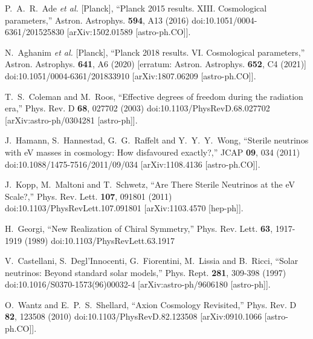 \documentclass[universe,article,submit,moreauthors,pdftex,a4paper]{Definitions/mdpi}
\begin{document}
\begin{thebibliography}{99}
P.~A.~R.~Ade \textit{et al.} [Planck],
``Planck 2015 results. XIII. Cosmological parameters,''
Astron. Astrophys. \textbf{594}, A13 (2016)
doi:10.1051/0004-6361/201525830
[arXiv:1502.01589 [astro-ph.CO]].

N.~Aghanim \textit{et al.} [Planck],
``Planck 2018 results. VI. Cosmological parameters,''
Astron. Astrophys. \textbf{641}, A6 (2020)
[erratum: Astron. Astrophys. \textbf{652}, C4 (2021)]
doi:10.1051/0004-6361/201833910
[arXiv:1807.06209 [astro-ph.CO]].

T.~S.~Coleman and M.~Roos,
``Effective degrees of freedom during the radiation era,''
Phys. Rev. D \textbf{68}, 027702 (2003)
doi:10.1103/PhysRevD.68.027702
[arXiv:astro-ph/0304281 [astro-ph]].

J.~Hamann, S.~Hannestad, G.~G.~Raffelt and Y.~Y.~Y.~Wong,
``Sterile neutrinos with eV masses in cosmology: How disfavoured exactly?,''
JCAP \textbf{09}, 034 (2011)
doi:10.1088/1475-7516/2011/09/034
[arXiv:1108.4136 [astro-ph.CO]].

J.~Kopp, M.~Maltoni and T.~Schwetz,
``Are There Sterile Neutrinos at the eV Scale?,''
Phys. Rev. Lett. \textbf{107}, 091801 (2011)
doi:10.1103/PhysRevLett.107.091801
[arXiv:1103.4570 [hep-ph]].

H.~Georgi,
``New Realization of Chiral Symmetry,''
Phys. Rev. Lett. \textbf{63}, 1917-1919 (1989)
doi:10.1103/PhysRevLett.63.1917

V.~Castellani, S.~Degl'Innocenti, G.~Fiorentini, M.~Lissia and B.~Ricci,
``Solar neutrinos: Beyond standard solar models,''
Phys. Rept. \textbf{281}, 309-398 (1997)
doi:10.1016/S0370-1573(96)00032-4
[arXiv:astro-ph/9606180 [astro-ph]].

O.~Wantz and E.~P.~S.~Shellard,
``Axion Cosmology Revisited,''
Phys. Rev. D \textbf{82}, 123508 (2010)
doi:10.1103/PhysRevD.82.123508
[arXiv:0910.1066 [astro-ph.CO]].


\end{thebibliography}
\end{document}
